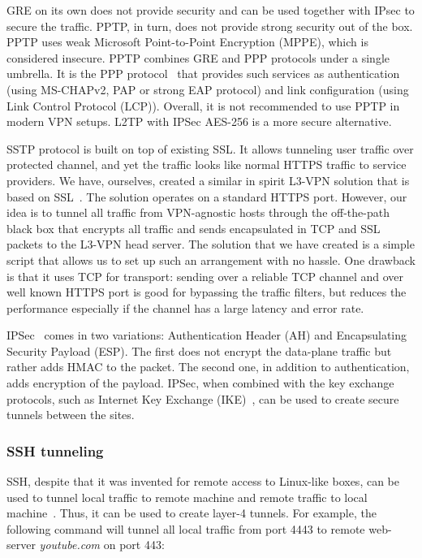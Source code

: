 GRE on its own does not provide security and can be used together with IPsec to secure 
the traffic. PPTP, in turn, does not provide strong security out of the box. PPTP uses 
weak Microsoft Point-to-Point Encryption (MPPE), which is considered insecure. PPTP combines 
GRE and PPP protocols under a single umbrella. It is the PPP protocol~\cite{tcpip}
that provides such services as authentication (using MS-CHAPv2, PAP or strong EAP protocol) 
and link configuration (\ie using Link Control Protocol (LCP)). Overall, it is not recommended
to use PPTP in modern VPN setups. L2TP with IPSec AES-256 is a more secure alternative.

SSTP protocol is built on top of existing SSL. It allows tunneling user traffic over protected 
channel, and yet the traffic looks like normal HTTPS traffic to service providers.
We have, ourselves, created a similar in spirit L3-VPN solution that is based on SSL~\cite{ssl:vpn}.
The solution operates on a standard HTTPS port. However, our idea is to tunnel 
all traffic from VPN-agnostic hosts through the off-the-path black box that encrypts 
all traffic and sends encapsulated in TCP and SSL
packets to the L3-VPN head server. The solution that we have created is a simple script 
that allows us to set up such an arrangement with no hassle. One drawback is that it 
uses TCP for transport: sending over a reliable TCP channel and over well known HTTPS port
is good for bypassing the traffic filters, but reduces the performance especially if
the channel has a large latency and error rate. 

IPSec~\cite{tcpip} comes in two variations: Authentication Header (AH) and Encapsulating Security Payload (ESP).
The first does not encrypt the data-plane traffic but rather adds HMAC to the packet. The second one, in
addition to authentication, adds encryption of the payload. IPSec, when combined with the key exchange 
protocols, such as Internet Key Exchange (IKE)~\cite{rfc4306}, can be used to create secure tunnels between the sites.

\subsubsection{SSH tunneling}

SSH, despite that it was invented for remote access to Linux-like boxes, can be used 
to tunnel local traffic to remote machine and remote traffic to local machine~\cite{ssh:tunneling}. Thus, it can be used to create
layer-4 tunnels. For example, the following command will tunnel all local traffic from
port 4443 to remote web-server {\it youtube.com} on port 443:

